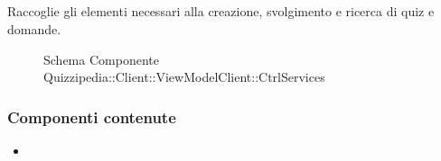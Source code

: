 \subsection{}
Raccoglie gli elementi necessari alla creazione, svolgimento e ricerca di quiz e domande.
\begin{figure}[H]
\centering
\noindent{}
\caption[Schema Componente Quizzipedia::Client::ViewModelClient::CtrlServices]{Schema Componente Quizzipedia::Client::ViewModelClient::CtrlServices}
\end{figure}
\subsubsection{Componenti contenute}
\begin{itemize}
\item {}
\end{itemize}
